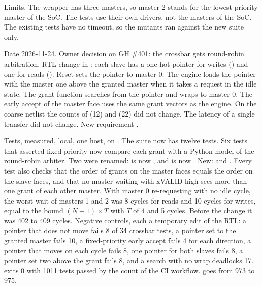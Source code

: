 \begin{record}

Limits. The wrapper has three masters, so master 2 stands for the lowest-priority master of the SoC. The tests use their own drivers, not the masters of the SoC. The existing  tests have no timeout, so the mutants ran against the new suite only.

\end{record}

\begin{record}

Date 2026-11-24. Owner decision on GH \#401: the crossbar gets round-robin arbitration. RTL change in : each slave has a one-hot pointer for writes () and one for reads (). Reset sets the pointer to master 0. The engine loads the pointer with the master one above the granted master when it takes a request in the idle state. The grant function  searches from the pointer and wraps to master 0. The early accept of the master face uses the same grant vectors as the engine. On the coarse netlist the counts of  (12) and  (22) did not change. The latency of a single transfer did not change. New requirement .

\end{record}

\begin{record}

Tests, measured, local, one host, on . The suite  now has twelve tests. Six tests that asserted fixed priority now compare each grant with a Python model of the round-robin arbiter. Two were renamed:  is now , and  is now . New:  and . Every test also checks that the order of grants on the master faces equals the order on the slave faces, and that no master waiting with xVALID high sees more than one grant of each other master. With master 0 re-requesting with no idle cycle, the worst wait of masters 1 and 2 was 8 cycles for reads and 10 cycles for writes, equal to the bound $(N-1) \times T$ with $T$ of 4 and 5 cycles. Before the change it was 402 to 409 cycles. Negative controls, each a temporary edit of the RTL: a pointer that does not move fails 8 of 34 crossbar tests, a pointer set to the granted master fails 10, a fixed-priority early accept fails 4 for each direction, a pointer that moves on each cycle fails 8, one pointer for both slaves fails 8, a pointer set two above the grant fails 8, and a search with no wrap deadlocks 17.  exits 0 with 1011 tests passed by the count of the CI workflow.  goes from 973 to 975.

\end{record}

